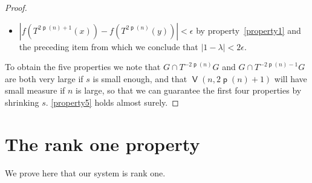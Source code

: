 \documentclass[10pt]{amsart}
\theoremstyle{definition}\newtheorem{defi}[theo]{Definition}\newtheorem{rema}[theo]{Remark}\newtheorem{exam}[theo]{Example}\newtheorem{exem}[theo]{Example}\newtheorem{nota}[theo]{Notation}
\DeclareMathOperator{\bad}{\mathsf{V}}
\DeclareMathOperator{\p}{\mathsf{p}}
\begin{document}
\begin{proof}
\begin{itemize}
\item $|f(T^{2\p(n) +1}(x)) - f(T^{2\p(n)}(y))| < \epsilon$ by property~\eqref{property1} and the preceding item
from which we conclude that $|1 - \lambda| < 2\epsilon$.
\end{itemize}
To obtain the five properties we note that $G \cap T^{-2\p(n)} G$ and $G \cap T^{-2\p(n)-1} G$ are both very large if $s$ is small enough, and that $\bad(n,2\p(n)+1)$ will have small measure if $n$ is large, so that we can guarantee the first four properties by shrinking $s$. \eqref{property5} holds almost surely.
\end{proof}


\pagebreak{}

\section{The rank one property}\label{sec:rank one}

We prove here that our system is rank one.
\end{document}
